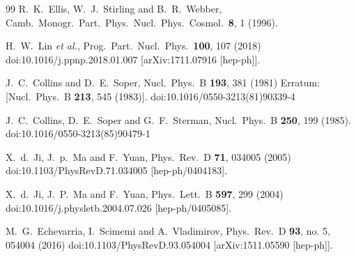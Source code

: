 \begin{thebibliography}{99}
  R.~K.~Ellis, W.~J.~Stirling and B.~R.~Webber,
  Camb.\ Monogr.\ Part.\ Phys.\ Nucl.\ Phys.\ Cosmol.\  {\bf 8}, 1 (1996).


  H.~W.~Lin {\it et al.},
  Prog.\ Part.\ Nucl.\ Phys.\  {\bf 100}, 107 (2018)
  doi:10.1016/j.ppnp.2018.01.007
  [arXiv:1711.07916 [hep-ph]].


  J.~C.~Collins and D.~E.~Soper,
  Nucl.\ Phys.\ B {\bf 193}, 381 (1981)
  Erratum: [Nucl.\ Phys.\ B {\bf 213}, 545 (1983)].
  doi:10.1016/0550-3213(81)90339-4


  J.~C.~Collins, D.~E.~Soper and G.~F.~Sterman,
  Nucl.\ Phys.\ B {\bf 250}, 199 (1985).
  doi:10.1016/0550-3213(85)90479-1


  X.~d.~Ji, J.~p.~Ma and F.~Yuan,
  Phys.\ Rev.\ D {\bf 71}, 034005 (2005)
  doi:10.1103/PhysRevD.71.034005
  [hep-ph/0404183].


  X.~d.~Ji, J.~P.~Ma and F.~Yuan,
  Phys.\ Lett.\ B {\bf 597}, 299 (2004)
  doi:10.1016/j.physletb.2004.07.026
  [hep-ph/0405085].


  M.~G.~Echevarria, I.~Scimemi and A.~Vladimirov,
  Phys.\ Rev.\ D {\bf 93}, no. 5, 054004 (2016)
  doi:10.1103/PhysRevD.93.054004
  [arXiv:1511.05590 [hep-ph]].



\end{thebibliography}
